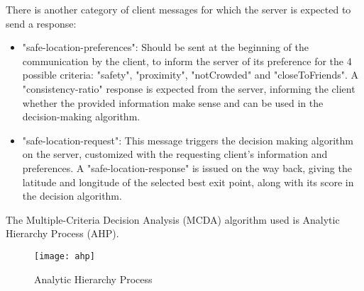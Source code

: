 There is another category of client messages for which the server is expected
to send a response:

\begin{itemize}
  \item "safe-location-preferences": Should be sent at the beginning of the
        communication by the client, to inform the server of its preference
        for the 4 possible criteria: "safety", "proximity", "notCrowded" and
        "closeToFriends". A "consistency-ratio" response is expected from the
        server, informing the client whether the provided information make
        sense and can be used in the decision-making algorithm.
  \item "safe-location-request": This message triggers the decision making
        algorithm on the server, customized with the requesting client's
        information and preferences. A "safe-location-response" is issued on
        the way back, giving the latitude and longitude of the selected best
        exit point, along with its score in the decision algorithm.
\end{itemize}

The Multiple-Criteria Decision Analysis (MCDA) algorithm used is Analytic
Hierarchy Process (AHP).

\begin{figure}
\centering
\texttt{[image: ahp]}
\caption{\label{fig:ahp} Analytic Hierarchy Process}
\end{figure}

